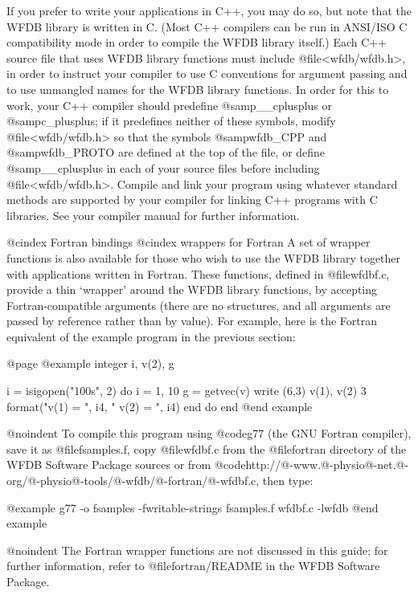 {{If you prefer to write your applications in C++, you may do so, but note
that the WFDB library is written in C.  (Most C++ compilers can be run
in ANSI/ISO C compatibility mode in order to compile the WFDB library
itself.)  Each C++ source file that uses WFDB library functions must
include @file{<wfdb/wfdb.h>}, in order to instruct your compiler to use
C conventions for argument passing and to use unmangled names for the
WFDB library functions.  In order for this to work, your C++ compiler
should predefine @samp{__cplusplus} or @samp{c_plusplus}; if it
predefines neither of these symbols, modify @file{<wfdb/wfdb.h>} so that
the symbols @samp{wfdb_CPP} and @samp{wfdb_PROTO} are defined at the top
of the file, or define @samp{__cplusplus} in each of your source files
before including @file{<wfdb/wfdb.h>}.  Compile and link your program
using whatever standard methods are supported by your compiler for
linking C++ programs with C libraries.  See your compiler manual for
further information.

@cindex Fortran bindings
@cindex wrappers for Fortran
A set of wrapper functions is also available for those who wish to use
the WFDB library together with applications written in Fortran.  These
functions, defined in @file{wfdbf.c}, provide a thin `wrapper' around the WFDB library functions, by
accepting Fortran-compatible arguments (there are no structures, and all
arguments are passed by reference rather than by value).  For example,
here is the Fortran equivalent of the example program in the previous
section:

@page
@example
        integer i, v(2), g

        i = isigopen("100s", 2)
        do i = 1, 10
         g = getvec(v)
         write (6,3) v(1), v(2)
 3      format("v(1) = ", i4, "    v(2) = ", i4)
        end do
        end
@end example

@noindent
To compile this program using @code{g77} (the GNU Fortran compiler), save it as
@file{fsamples.f}, copy @file{wfdbf.c} from the @file{fortran} directory of the
WFDB Software Package sources or from
@code{http://@-www.@-physio@-net.@-org/@-physio@-tools/@-wfdb/@-fortran/@-wfdbf.c},
then type:

@example
g77 -o fsamples -fwritable-strings fsamples.f wfdbf.c -lwfdb
@end example

@noindent
The Fortran wrapper functions are not discussed in this guide; for further
information, refer to @file{fortran/README} in the WFDB Software Package.

}}
